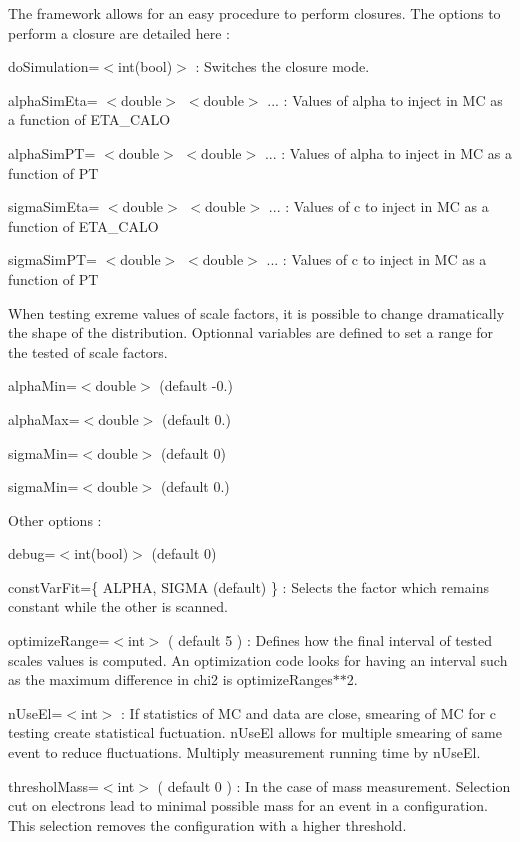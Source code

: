 The framework allows for an easy procedure to perform closures. The options to perform a closure are detailed here \+:
\begin{DoxyItemize}
\item do\+Simulation=$<$int(bool)$>$ \+: Switches the closure mode.
\item alpha\+Sim\+Eta= $<$double$>$ $<$double$>$ ... \+: Values of alpha to inject in M\+C as a function of E\+T\+A\+\_\+\+C\+A\+L\+O
\item alpha\+Sim\+P\+T= $<$double$>$ $<$double$>$ ... \+: Values of alpha to inject in M\+C as a function of P\+T
\item sigma\+Sim\+Eta= $<$double$>$ $<$double$>$ ... \+: Values of c to inject in M\+C as a function of E\+T\+A\+\_\+\+C\+A\+L\+O
\item sigma\+Sim\+P\+T= $<$double$>$ $<$double$>$ ... \+: Values of c to inject in M\+C as a function of P\+T
\end{DoxyItemize}

When testing exreme values of scale factors, it is possible to change dramatically the shape of the distribution. Optionnal variables are defined to set a range for the tested of scale factors.
\begin{DoxyItemize}
\item alpha\+Min=$<$double$>$ (default -\/0.)
\item alpha\+Max=$<$double$>$ (default 0.)
\item sigma\+Min=$<$double$>$ (default 0)
\item sigma\+Min=$<$double$>$ (default 0.)
\end{DoxyItemize}

Other options \+:
\begin{DoxyItemize}
\item debug=$<$int(bool)$>$ (default 0)
\item const\+Var\+Fit=\{ A\+L\+P\+H\+A, S\+I\+G\+M\+A (default) \} \+: Selects the factor which remains constant while the other is scanned.
\item optimize\+Range=$<$int$>$ ( default 5 ) \+: Defines how the final interval of tested scales values is computed. An optimization code looks for having an interval such as the maximum difference in chi2 is optimize\+Ranges$\ast$$\ast$2.
\item n\+Use\+El=$<$int$>$ \+: If statistics of M\+C and data are close, smearing of M\+C for c testing create statistical fuctuation. n\+Use\+El allows for multiple smearing of same event to reduce fluctuations. Multiply measurement running time by n\+Use\+El.
\item threshol\+Mass=$<$int$>$ ( default 0 ) \+: In the case of mass measurement. Selection cut on electrons lead to minimal possible mass for an event in a configuration. This selection removes the configuration with a higher threshold.
\end{DoxyItemize}


